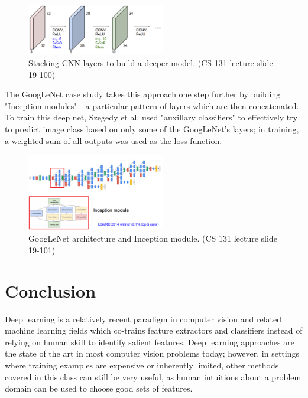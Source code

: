 \documentclass{article}
\begin{document}
\begin{figure}[h]
\includegraphics[width=6cm]{CNN_stacking.png}
\centering
\caption{Stacking CNN layers to build a deeper model. (CS 131 lecture slide 19-100)}
\end{figure}



The GoogLeNet case study takes this approach one step further by building "Inception modules" - a particular pattern of layers which are then concatenated. To train this deep net, Szegedy et al. \cite{DBLP:journals/corr/SzegedyLJSRAEVR14} used "auxillary classifiers" to effectively try to predict image class based on only some of the GoogLeNet's layers; in training, a weighted sum of all outputs was used as the loss function.

\begin{figure}[h]
\includegraphics[width=6cm]{Inception.png}
\centering
\caption{GoogLeNet architecture and Inception module. (CS 131 lecture slide 19-101)}
\end{figure}
 
\section{Conclusion}
Deep learning is a relatively recent paradigm in computer vision and related machine learning fields which co-trains feature extractors and classifiers instead of relying on human skill to identify salient features. Deep learning approaches are the state of the art in most computer vision problems today; however, in settings where training examples are expensive or inherently limited, other methods covered in this class can still be very useful, as human intuitions about a problem domain can be used to choose good sets of features.
\small


\end{document}

